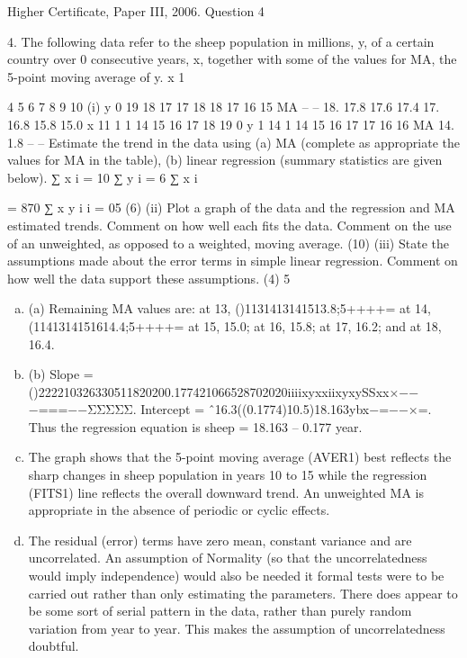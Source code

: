 \documentclass[a4paper,12pt]{article}
\begin{document}
Higher Certificate, Paper III, 2006. Question 4
\begin{framed}
4.
The following data refer to the sheep population in millions, y, of a certain country
over 0 consecutive years, x, together with some of the values for MA, the 5-point
moving average of y.
x
1


4
5
6
7
8
9
10
(i)
y
0
19
18
17
17
18
18
17
16
15
MA
–
–
18.
17.8
17.6
17.4
17.
16.8
15.8
15.0
x
11
1
1
14
15
16
17
18
19
0
y
1
14
1
14
15
16
17
17
16
16
MA
14.
1.8
–
–
Estimate the trend in the data using
(a) MA (complete as appropriate the values for MA in the table),
(b) linear regression (summary statistics are given below).
∑ x
i
= 10
∑ y
i
= 6
∑ x
i

= 870
∑ x y
i
i
= 05
(6)
(ii) Plot a graph of the data and the regression and MA estimated trends. Comment
on how well each fits the data. Comment on the use of an unweighted, as
opposed to a weighted, moving average.
(10)
(iii) State the assumptions made about the error terms in simple linear regression.
Comment on how well the data support these assumptions.
(4)
5
\end{framed}


\begin{enumerate}[(a)]
    \item 
(a) Remaining MA values are: at 13, ()1131413141513.8;5++++= at 14, (1141314151614.4;5++++= at 15, 15.0; at 16, 15.8; at 17, 16.2; and at 18, 16.4.
   \item(b) Slope = ()222210326330511820200.177421066528702020iiiixyxxiixyxySSxx×−−−===−−ΣΣΣΣΣ.
Intercept = ˆ16.3((0.1774)10.5)18.163ybx−=−−×=.
Thus the regression equation is sheep = 18.163 – 0.177 year.
   \item The graph shows that the 5-point moving average (AVER1) best reflects the sharp changes in sheep population in years 10 to 15 while the regression (FITS1) line reflects the overall downward trend.
An unweighted MA is appropriate in the absence of periodic or cyclic effects.
   \item The residual (error) terms have zero mean, constant variance and are uncorrelated. An assumption of Normality (so that the uncorrelatedness would imply independence) would also be needed it formal tests were to be carried out rather than only estimating the parameters. There does appear to be some sort of serial pattern in the data, rather than purely random variation from year to year. This makes the assumption of uncorrelatedness doubtful.
 \end{enumerate}
 
\end{document}
